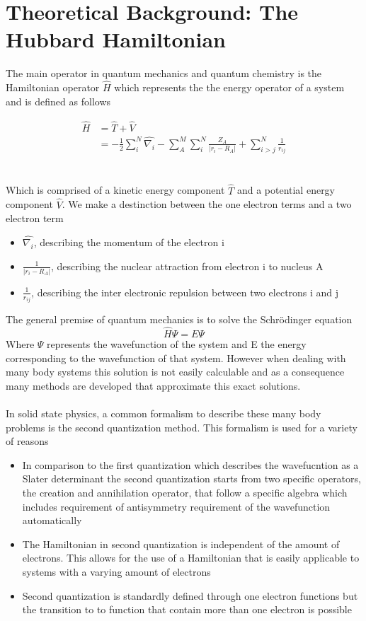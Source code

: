 \documentclass[]{article}
\begin{document}
\section{Theoretical Background: The Hubbard Hamiltonian}

The main operator in quantum mechanics and quantum chemistry is the Hamiltonian operator $\hat{H}$ which represents the the energy operator of a system and is defined as follows

\begin{equation}
	\begin{split}
		\hat{H} & = \hat{T} + \hat{V} \\
		& = -\frac{1}{2}\sum_{i}^{N} \hat{\nabla_i} -\sum_{A}^{M}\sum_{i}^{N} \frac{Z_A}{\lvert r_i - R_A \rvert} + \sum_{i>j}^{N} \frac{1}{r_{ij}}
	\end{split} 
\end{equation}
\\
\\
Which is comprised of a kinetic energy component $\hat{T}$ and a potential energy component $\hat{V}$. We make a destinction between the one electron terms and a two electron term
\begin{itemize}
	\item  $\hat{\nabla_i}$, describing the momentum of the electron i
	\item $\frac{1}{\lvert r_i - R_A \rvert}$, describing the nuclear attraction from electron i to nucleus A
	\item $\frac{1}{r_{ij}}$, describing the inter electronic repulsion between two electrons i and j
\end{itemize}
The general premise of quantum mechanics is to solve the Schrödinger equation
\begin{equation}
	\hat{H}\Psi = E\Psi
\end{equation}
Where $\Psi$ represents the wavefunction of the system and E the energy corresponding to the wavefunction of that system. However when dealing with many body systems this solution is not easily calculable and as a consequence many methods are developed that approximate this exact solutions.
\\
\\
In solid state physics, a common formalism to describe these many body problems is the second quantization method. This formalism is used for a variety of reasons
\begin{itemize}
	\item In comparison to the first quantization which describes the wavefucntion as a Slater determinant the second quantization starts from two specific operators, the creation and annihilation operator, that follow a specific algebra which includes requirement of antisymmetry requirement of the wavefunction automatically
	\item The Hamiltonian in second quantization is independent of the amount of electrons. This allows for the use of a Hamiltonian that is easily applicable to systems with a varying amount of electrons
	\item Second quantization is standardly defined through one electron functions but the transition to to function that contain more than one electron is possible 	
\end{itemize}
\end{document}
